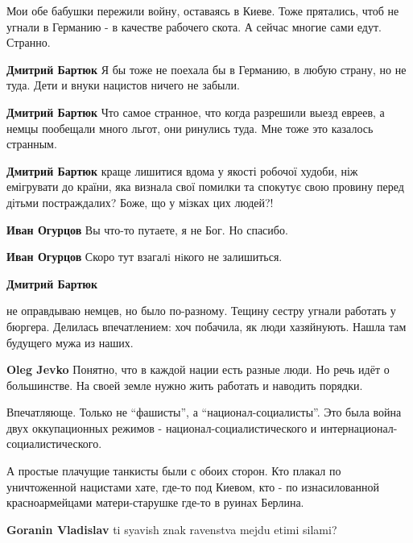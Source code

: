 \begin{itemize}

Мои обе бабушки пережили войну, оставаясь в Киеве. Тоже прятались, чтоб не
угнали в Германию - в качестве рабочего скота. А сейчас многие сами едут.
Странно.

\begin{itemize} %
\textbf{Дмитрий Бартюк} Я бы тоже не поехала бы в Германию, в любую страну, но не туда. Дети и внуки нацистов ничего не забыли.

\textbf{Дмитрий Бартюк} Что самое странное, что когда разрешили выезд евреев, а немцы пообещали много льгот, они ринулись туда. Мне тоже это казалось странным.

\textbf{Дмитрий Бартюк} краще лишитися вдома у якості робочої худоби, ніж емігрувати до країни, яка визнала свої помилки та спокутує свою провину перед дітьми постраждалих? Боже, що у мізках цих людей?!

\begin{itemize} %
\textbf{Иван Огурцов} Вы что-то путаете, я не Бог. Но спасибо.

\textbf{Иван Огурцов} Скоро тут взагалi нiкого не залишиться.
\end{itemize} %

\textbf{Дмитрий Бартюк} 

не оправдываю немцев, но было по-разному. Тещину сестру угнали работать у
бюргера. Делилась впечатлением: хоч побачила, як люди хазяйнують. Нашла там
будущего мужа из наших.


\textbf{Oleg Jevko} Понятно, что в каждой нации есть разные люди. Но речь идёт о большинстве. На своей земле нужно жить работать и наводить порядки.

\end{itemize} %


Впечатляюще. Только не \enquote{фашисты}, а \enquote{национал-социалисты}. Это была война двух
оккупационных режимов - национал-социалистического и
интернационал-социалистического.

А простые плачущие танкисты были с обоих сторон. Кто плакал по уничтоженной
нацистами хате, где-то под Киевом, кто - по изнасилованной красноармейцами
матери-старушке где-то в руинах Берлина.

\begin{itemize} %
\textbf{Goranin Vladislav} ti syavish znak ravenstva mejdu etimi silami?



\end{itemize}
\end{itemize}
